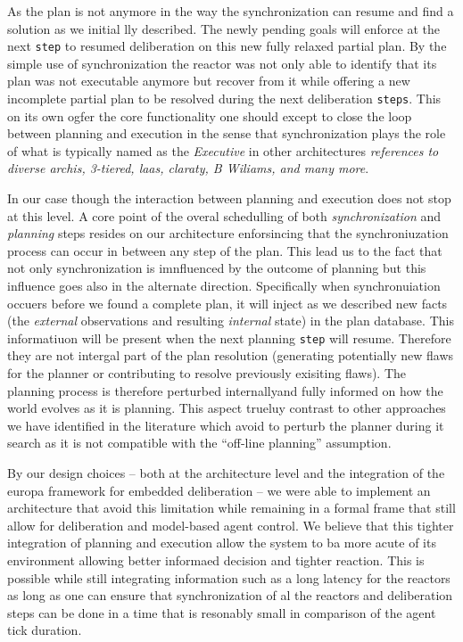 As the plan is not anymore in the way the synchronization can resume
and find a solution as we initial lly described. The newly pending
goals will enforce at the next \texttt{step} to resumed deliberation
on this new fully relaxed partial plan. By the simple use of
synchronization the reactor was not only able to identify that its
plan was not executable anymore but recover from it while offering a
new incomplete partial plan to be resolved during the next
deliberation \texttt{steps}. This on its own ogfer the core
functionality one should except to close the loop between planning and
execution in the sense that synchronization plays the role of what is
typically named as the {\em Executive} in other architectures
{\em\color{red} references to diverse archis, 3-tiered, laas, claraty,
  B Wiliams, and many more}.

In our case though the interaction between planning and execution does
not stop at this level. A core point of the overal schedulling of both
{\em synchronization} and {\em planning} steps resides on our
architecture enforsincing that the synchroniuzation process can occur
in between any step of the plan. This lead us to the fact that not
only synchronization is imnfluenced by the outcome of planning but
this influence goes also in the alternate direction. Specifically when
synchronuiation occuers before we found a complete plan, it will
inject as we described new facts (the {\em external} observations and
resulting {\em internal} state) in the plan database. This
informatiuon will be present when the next planning \texttt{step} will
resume. Therefore they are not intergal part of the plan resolution
(generating potentially new flaws for the planner or contributing to
resolve previously exisiting flaws). The planning process is therefore
perturbed internallyand fully informed on how the world evolves as it
is planning.  This aspect trueluy contrast to other approaches we have
identified in the literature which avoid to perturb the planner during
it search as it is not compatible with the ``off-line planning''
assumption.

By our design choices -- both at the architecture level and the
integration of the europa framework for embedded deliberation -- we
were able to implement an architecture that avoid this limitation
while remaining in a formal frame that still allow for deliberation
and model-based agent control. We believe that this tighter
integration of planning and execution allow the system to ba more
acute of its environment allowing better informaed decision and
tighter reaction. This is possible while still integrating information
such as a long latency for the reactors as long as one can ensure that
synchronization of al the reactors and deliberation steps can be done
in a time that is resonably small in comparison of the agent tick
duration.








